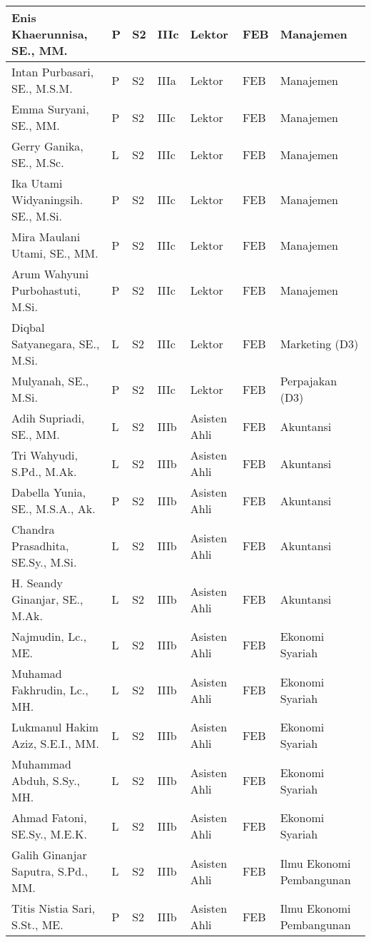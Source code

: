 \documentclass[
]{book}
\begin{document}
\begin{longtable}{l|l|l|l|l|l|l}
\hline
Enis Khaerunnisa, SE., MM. & P & S2 & IIIc & Lektor & FEB & Manajemen\\
\hline
Intan Purbasari, SE., M.S.M. & P & S2 & IIIa & Lektor & FEB & Manajemen\\
\hline
Emma Suryani, SE., MM. & P & S2 & IIIc & Lektor & FEB & Manajemen\\
\hline
Gerry Ganika, SE., M.Sc. & L & S2 & IIIc & Lektor & FEB & Manajemen\\
\hline
Ika Utami Widyaningsih. SE., M.Si. & P & S2 & IIIc & Lektor & FEB & Manajemen\\
\hline
Mira Maulani Utami, SE., MM. & P & S2 & IIIc & Lektor & FEB & Manajemen\\
\hline
Arum Wahyuni Purbohastuti, M.Si. & P & S2 & IIIc & Lektor & FEB & Manajemen\\
\hline
Diqbal Satyanegara, SE., M.Si. & L & S2 & IIIc & Lektor & FEB & Marketing (D3)\\
\hline
Mulyanah, SE., M.Si. & P & S2 & IIIc & Lektor & FEB & Perpajakan (D3)\\
\hline
Adih Supriadi, SE., MM. & L & S2 & IIIb & Asisten Ahli & FEB & Akuntansi\\
\hline
Tri Wahyudi, S.Pd., M.Ak. & L & S2 & IIIb & Asisten Ahli & FEB & Akuntansi\\
\hline
Dabella Yunia, SE., M.S.A., Ak. & P & S2 & IIIb & Asisten Ahli & FEB & Akuntansi\\
\hline
Chandra Prasadhita, SE.Sy., M.Si. & L & S2 & IIIb & Asisten Ahli & FEB & Akuntansi\\
\hline
H. Seandy Ginanjar, SE., M.Ak. & L & S2 & IIIb & Asisten Ahli & FEB & Akuntansi\\
\hline
Najmudin, Lc., ME. & L & S2 & IIIb & Asisten Ahli & FEB & Ekonomi Syariah\\
\hline
Muhamad Fakhrudin, Lc., MH. & L & S2 & IIIb & Asisten Ahli & FEB & Ekonomi Syariah\\
\hline
Lukmanul Hakim Aziz, S.E.I., MM. & L & S2 & IIIb & Asisten Ahli & FEB & Ekonomi Syariah\\
\hline
Muhammad Abduh, S.Sy., MH. & L & S2 & IIIb & Asisten Ahli & FEB & Ekonomi Syariah\\
\hline
Ahmad Fatoni, SE.Sy., M.E.K. & L & S2 & IIIb & Asisten Ahli & FEB & Ekonomi Syariah\\
\hline
Galih Ginanjar Saputra, S.Pd., MM. & L & S2 & IIIb & Asisten Ahli & FEB & Ilmu Ekonomi Pembangunan\\
\hline
Titis Nistia Sari, S.St., ME. & P & S2 & IIIb & Asisten Ahli & FEB & Ilmu Ekonomi Pembangunan\\

\end{longtable}
\end{document}
